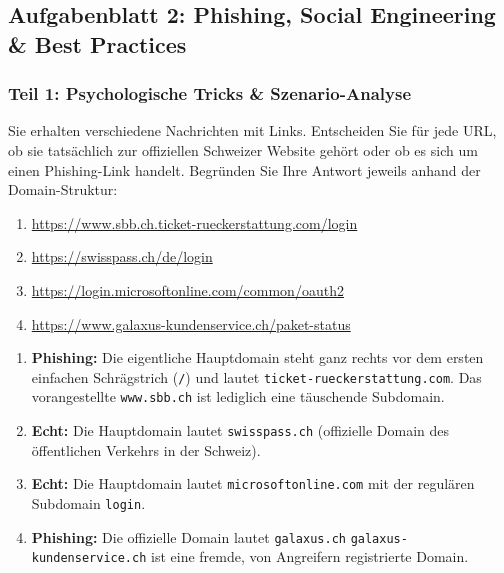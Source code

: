 \documentclass[12pt,a4paper]{article}
\begin{document}
\subsection{Aufgabenblatt 2: Phishing, Social Engineering \& \newline Best Practices}
\label{subsec:aufgaben_phishing}

\subsubsection{Teil 1: Psychologische Tricks \& Szenario-Analyse}

\begin{taskbox}
Sie erhalten verschiedene Nachrichten mit Links. Entscheiden Sie für jede URL, ob sie tatsächlich zur offiziellen Schweizer Website gehört oder ob es sich um einen Phishing-Link handelt. Begründen Sie Ihre Antwort jeweils anhand der Domain-Struktur:
\begin{enumerate}[label=\alph*)]
    \item \url{https://www.sbb.ch.ticket-rueckerstattung.com/login}
    \item \url{https://swisspass.ch/de/login}
    \item \url{https://login.microsoftonline.com/common/oauth2}
    \item \url{https://www.galaxus-kundenservice.ch/paket-status}
\end{enumerate}
\end{taskbox}

\begin{solutionbox}
\begin{enumerate}[label=\alph*)]
    \item \textbf{Phishing:} Die eigentliche Hauptdomain steht ganz rechts vor dem ersten einfachen Schrägstrich (\texttt{/}) und lautet \texttt{ticket-rueckerstattung.com}. Das vorangestellte \texttt{www.sbb.ch} ist lediglich eine täuschende Subdomain.
    \item \textbf{Echt:} Die Hauptdomain lautet \texttt{swisspass.ch} (offizielle Domain des öffentlichen Verkehrs in der Schweiz).
    \item \textbf{Echt:} Die Hauptdomain lautet \texttt{microsoftonline.com} mit der regulären Subdomain \texttt{login}.
    \item \textbf{Phishing:} Die offizielle Domain lautet \texttt{galaxus.ch} \texttt{galaxus-kundenservice.ch} ist eine fremde, von Angreifern registrierte Domain.
\end{enumerate}
\end{solutionbox}
\end{document}
